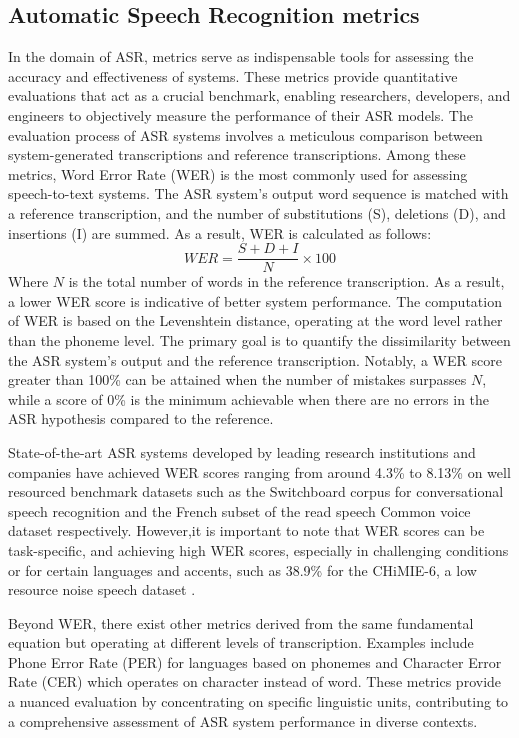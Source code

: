 \subsection{Automatic Speech Recognition metrics}%
In the domain of ASR, metrics serve as indispensable tools for assessing the accuracy and effectiveness of systems. These metrics provide quantitative evaluations that act as a crucial benchmark, enabling researchers, developers, and engineers to objectively measure the performance of their ASR models. The evaluation process of ASR systems involves a meticulous comparison between system-generated transcriptions and reference transcriptions. Among these metrics, Word Error Rate (WER) is the most commonly used for assessing speech-to-text systems. The ASR system's output word sequence is matched with a reference transcription, and the number of substitutions (S), deletions (D), and insertions (I) are summed. As a result, WER is calculated as follows:
\begin{equation}
    WER = \frac{S  + D +I}{N} \times 100
\end{equation}
Where $N$ is the total number of words in the reference transcription. As a result, a lower WER score is indicative of better system performance. The computation of WER is based on the Levenshtein distance, operating at the word level rather than the phoneme level. The primary goal is to quantify the dissimilarity between the ASR system's output and the reference transcription. Notably, a WER score greater than 100\% can be attained when the number of mistakes surpasses $N$, while a score of 0\% is the minimum achievable when there are no errors in the ASR hypothesis compared to the reference.

State-of-the-art ASR systems developed by leading research institutions and companies have achieved WER scores ranging from around 4.3\%  to 8.13\% on well resourced benchmark datasets such as the Switchboard corpus for conversational speech recognition \cite{tuske2021limit} and the French subset of the read speech Common voice dataset \cite{bermuth2021scribosermo} respectively. However,it is important to note that WER scores can be task-specific, and achieving high WER scores, especially in challenging conditions or for certain languages and accents, such as 38.9\% for the CHiMIE-6, a low resource noise speech dataset \cite{chan2021speechstew}.

Beyond WER, there exist other metrics derived from the same fundamental equation but operating at different levels of transcription. Examples include Phone Error Rate (PER) for languages based on phonemes and Character Error Rate (CER) which operates on character instead of word. These metrics provide a nuanced evaluation by concentrating on specific linguistic units, contributing to a comprehensive assessment of ASR system performance in diverse contexts.

